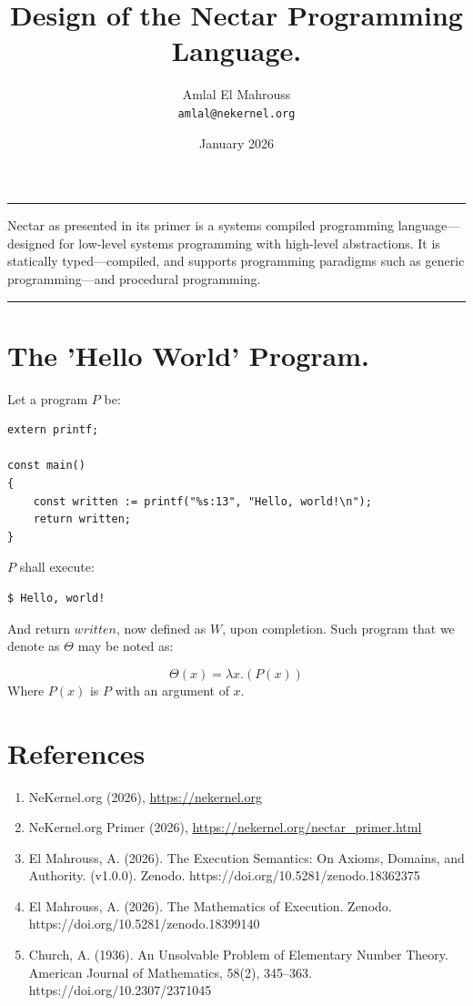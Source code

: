 \documentclass[11pt, a4paper]{article}
\title{Design of the Nectar Programming Language.}
\author{Amlal El Mahrouss\\\texttt{amlal@nekernel.org}}
\date{January 2026}
\begin{document}
\bf \maketitle

\begin{center}
	\rule[0.01cm]{17cm}{0.01cm}
\end{center}

\abstract
{
	Nectar as presented in its primer is a systems compiled programming language—designed for low-level systems programming with high-level abstractions.
	It is statically typed—compiled, and supports programming paradigms such as generic programming—and procedural programming.
}

\begin{center}
	\rule[1cm]{17cm}{0.01cm}
\end{center}

\section{The 'Hello World' Program.}

Let a program $P$ be:

\begin{lstlisting}
extern printf;

const main()
{
    const written := printf("%s:13", "Hello, world!\n");
    return written;
}
\end{lstlisting} $P$ shall execute:

\begin{lstlisting}
$ Hello, world!
\end{lstlisting} And return $written$, now defined as $W$, upon completion. Such program that we denote as $\Theta$ may be noted as:

\begin{equation}
	\Theta(x) = \lambda x.(P(x))
\end{equation} Where $P(x)$ is $P$ with an argument of $x$.

\section{References}

\begin{enumerate}
  \item NeKernel.org (2026), \href{https://nekernel.org/nekernel}{https://nekernel.org}
  \item NeKernel.org Primer (2026), \href{https://nekernel.org/nectar\_primer.html}{https://nekernel.org/nectar\_primer.html}
  \item El Mahrouss, A. (2026). The Execution Semantics: On Axioms, Domains, and Authority. (v1.0.0). Zenodo. https://doi.org/10.5281/zenodo.18362375
	\item El Mahrouss, A. (2026). The Mathematics of Execution. Zenodo. \\https://doi.org/10.5281/zenodo.18399140
	\item Church, A. (1936). An Unsolvable Problem of Elementary Number Theory. American Journal of Mathematics, 58(2), 345–363. https://doi.org/10.2307/2371045
\end{enumerate}
\end{document}
